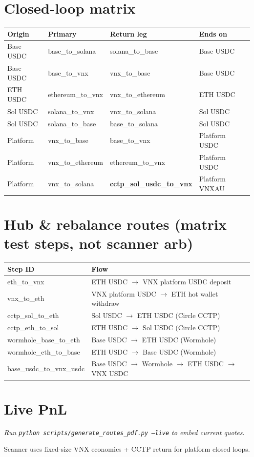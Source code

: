 \documentclass[11pt,a4paper]{article}
\begin{document}
\section*{Closed-loop matrix}
\small
\begin{longtable}{@{}llll@{}}
\toprule
Origin & Primary & Return leg & Ends on \\
\midrule
\endhead
Base USDC & base\_to\_solana & solana\_to\_base & Base USDC \\
Base USDC & base\_to\_vnx & vnx\_to\_base & Base USDC \\
ETH USDC & ethereum\_to\_vnx & vnx\_to\_ethereum & ETH USDC \\
Sol USDC & solana\_to\_vnx & vnx\_to\_solana & Sol USDC \\
Sol USDC & solana\_to\_base & base\_to\_solana & Sol USDC \\
Platform & vnx\_to\_base & base\_to\_vnx & Platform USDC \\
Platform & vnx\_to\_ethereum & ethereum\_to\_vnx & Platform USDC \\
Platform & vnx\_to\_solana & \textbf{cctp\_sol\_usdc\_to\_vnx} & Platform VNXAU \\
\bottomrule
\end{longtable}
\normalsize
\section*{Hub \& rebalance routes (matrix test steps, not scanner arb)}
\begin{tabular}{@{}ll@{}}
\toprule
Step ID & Flow \\
\midrule
eth\_to\_vnx & ETH USDC $\rightarrow$ VNX platform USDC deposit \\
vnx\_to\_eth & VNX platform USDC $\rightarrow$ ETH hot wallet withdraw \\
cctp\_sol\_to\_eth & Sol USDC $\rightarrow$ ETH USDC (Circle CCTP) \\
cctp\_eth\_to\_sol & ETH USDC $\rightarrow$ Sol USDC (Circle CCTP) \\
wormhole\_base\_to\_eth & Base USDC $\rightarrow$ ETH USDC (Wormhole) \\
wormhole\_eth\_to\_base & ETH USDC $\rightarrow$ Base USDC (Wormhole) \\
base\_usdc\_to\_vnx\_usdc & Base USDC $\rightarrow$ Wormhole $\rightarrow$ ETH USDC $\rightarrow$ VNX USDC \\
\bottomrule
\end{tabular}
\section*{Live PnL}
\textit{Run \texttt{python scripts/generate\_routes\_pdf.py --live} to embed current quotes.}
\vfill
\begin{center}
\color{muted}\small Scanner uses fixed-size VNX economics + CCTP return for platform closed loops.
\end{center}
\end{document}

